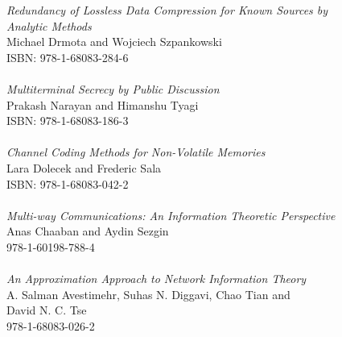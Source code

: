 \vspace{12pt}
\noindent \textit{Redundancy of Lossless Data Compression for Known Sources by\\ Analytic Methods}\\
Michael Drmota and Wojciech Szpankowski\\
ISBN: 978-1-68083-284-6\\
\\
\noindent \textit{Multiterminal Secrecy by Public Discussion}\\
Prakash Narayan and Himanshu Tyagi\\
ISBN: 978-1-68083-186-3\\
\\
\noindent \textit{Channel Coding Methods for Non-Volatile Memories}\\
Lara Dolecek and Frederic Sala\\
ISBN: 978-1-68083-042-2\\
\\
\noindent \textit{Multi-way Communications: An Information Theoretic Perspective}\\
Anas Chaaban and Aydin Sezgin\\
978-1-60198-788-4\\
\\
\noindent \textit{An Approximation Approach to Network Information Theory}\\
A. Salman Avestimehr, Suhas N. Diggavi, Chao Tian and\\ David N. C. Tse\\
978-1-68083-026-2